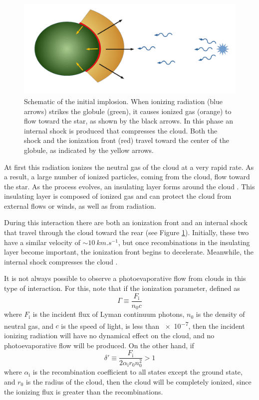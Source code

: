 \documentclass{book}
\begin{document}
\begin{figure}[htb]
    \centering
    \includegraphics[width= \textwidth]{ultimos/implosion_inicial.pdf}
    \caption{Schematic of the initial implosion. When ionizing
      radiation (blue arrows) strikes the globule (green), it causes
      ionized gas (orange) to flow toward the star, as shown by the
      black arrows. In this phase an internal shock is produced that
      compresses the cloud. Both the shock and the ionization front
      (red) travel toward the center of the globule, as indicated by
      the yellow arrows.}
    \label{fig:evolucion de la nube}
\end{figure}

At first this radiation ionizes the neutral gas of the cloud at a very
rapid rate. As a result, a large number of ionized particles, coming
from the cloud, flow toward the star. As the process evolves, an
insulating layer forms around the cloud \citep{OortySpitzer_1955}.
This insulating layer is composed of ionized gas and can protect the
cloud from external flows or winds, as well as from radiation.

During this interaction there are both an ionization front and an
internal shock that travel through the cloud toward the rear (see
Figure \ref{fig:evolucion de la nube}). Initially, these two have a
similar velocity of $\sim\SI{10}{km.s^{-1}}$, but once recombinations
in the insulating layer become important, the ionization front begins
to decelerate. Meanwhile, the internal shock compresses the cloud
\citep{Bertoldi_1989}.

It is not always possible to observe a photoevaporative flow from
clouds in this type of interaction. For this,
\cite{Bertoldi_1989} note that if the ionization parameter, defined as
\begin{equation}
    \Gamma  \equiv \frac{F_\mathrm{i}}{n_0 c}
\end{equation}
where $F_\mathrm{i}$ is the incident flux of Lyman continuum photons,
$n_0$ is the density of neutral gas, and $c$ is the speed of light, is
less than \SI{e-7}{}, then the incident ionizing radiation will have
no dynamical effect on the cloud, and no photoevaporative flow will be
produced. On the other hand, if
\begin{equation}
    \delta'\equiv\frac{F_\mathrm{i}}{2\alpha_\mathrm{i} r_0 n_0^2}>1
\end{equation}
where $\alpha_\mathrm{i}$ is the recombination coefficient to all
states except the ground state, and $r_0$ is the radius of the cloud,
then the cloud will be completely ionized, since the ionizing flux is
greater than the recombinations.
\end{document}
